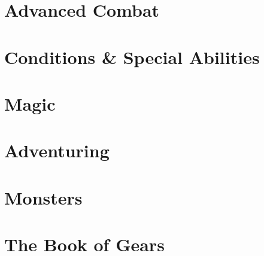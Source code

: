 \documentclass[10pt]{report}
\begin{document}
\chapter{Advanced Combat}








\chapter{Conditions \& Special Abilities}






%
%
%
%
%


\chapter{Magic}










\chapter{Adventuring}









\chapter{Monsters}





\appendix

\chapter{The Book of Gears}

\end{document}
